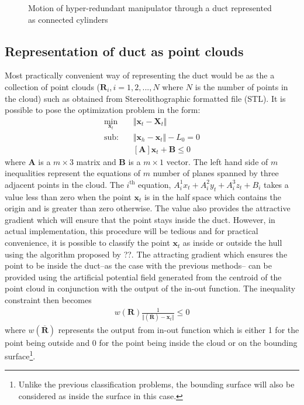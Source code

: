 \documentclass[12pt,a4]{article}
\begin{document}
\begin{figure}[ht!]
\begin{subfigure}{0.31\textwidth}
    \end{subfigure}%
    
    \caption{ Motion of hyper-redundant manipulator through a duct represented as connected cylinders}
\end{figure}


\subsection{Representation of duct as point clouds}
Most practically convenient way of representing the duct would be as the a collection of point clouds  ($\mathbf{R}_i,i=1,2,...,N$ where $N$ is the number of points in the cloud) such as obtained from Stereolithographic formatted file (STL). It is possible to pose the optimization problem in the form:
\begin{align}
\label{eq:STLeqs}
\min_{\textbf{x}_t} &\Vert \textbf{x}_t-\textbf{X}_t \Vert\\
\nonumber \text{sub:~~~} &\Vert \textbf{x}_h - \textbf{x}_t \Vert -L_0 = 0\\
&[\mathbf{A}]\mathbf{x}_t+\mathbf{B}\leq 0
\end{align}
where $\mathbf{A}$ is a $m\times 3$ matrix and $\mathbf{B}$ is a $m\times 1$ vector. The left hand side of $m$ inequalities represent the equations of $m$ number of planes spanned by three adjacent points in the cloud. The $i^\text{th}$ equation, $A_{i}^1x_t+A_{i}^2y_t+A_{i}^3z_t+B_i$ takes a value less than zero when the point $\mathbf{x}_t$ is in the half space which contains the origin and is greater than zero otherwise. The value also provides the attractive gradient which will ensure that the point stays inside the duct. However, in actual implementation, this procedure will be tedious and for practical convenience, it is possible to classify the point $\mathbf{x}_t$ as inside or outside the hull using the algorithm proposed by ??. The attracting gradient which ensures the point to be inside the duct--as the case with the previous methods-- can be provided using the artificial potential field generated from the centroid of the point cloud in conjunction with the output of the in-out function. The inequality constraint then becomes
\begin{align}
\label{eq:STLineq}
w(\mathbf{R})\frac{1}{\Vert(\overline{\mathbf{R}})-\mathbf{x}_t\Vert}\leq 0
\end{align}
where $w(\overline{\mathbf{R}})$ represents the output from in-out function which is either 1 for the point being outside and 0 for the point being inside the cloud or on the bounding surface\footnote{Unlike the previous classification problems, the bounding surface will also be considered as inside the surface in this case.}. 
\end{document}
